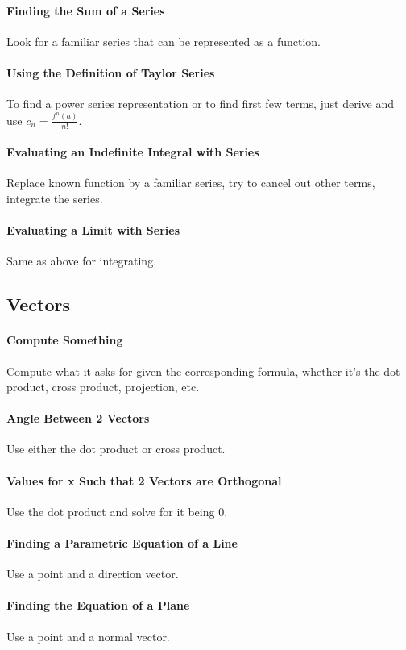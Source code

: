 \documentclass[12 pt]{article}
\theoremstyle{definition}
\begin{document}
\paragraph{Finding the Sum of a Series} Look for a familiar series that can be represented as a function.
\paragraph{Using the Definition of Taylor Series} To find a power series representation or to find first few terms, just derive and use $c_n=\frac{f^{n}(a)}{n!}$.
\paragraph{Evaluating an Indefinite Integral with Series} Replace known function by a familiar series, try to cancel out other terms, integrate the series.
\paragraph{Evaluating a Limit with Series} Same as above for integrating.
\subsection{Vectors}
\paragraph{Compute Something} Compute what it asks for given the corresponding formula, whether it's the dot product, cross product, projection, etc.
\paragraph{Angle Between 2 Vectors} Use either the dot product or cross product.
\paragraph{Values for x Such that 2 Vectors are Orthogonal} Use the dot product and solve for it being $0$.
\paragraph{Finding a Parametric Equation of a Line} Use a point and a direction vector.
\paragraph{Finding the Equation of a Plane} Use a point and a normal vector.
\end{document}
